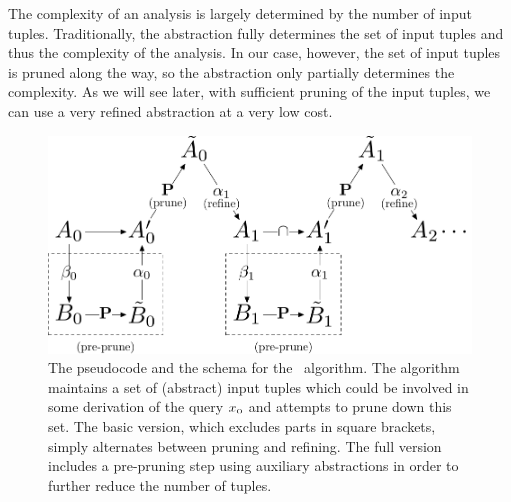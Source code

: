 The complexity of an analysis is largely determined by the number of input
tuples.  Traditionally, the abstraction fully determines the set of input
tuples and thus the complexity of the analysis.  In our case, however, the set
of input tuples is pruned along the way, so the abstraction only partially
determines the complexity.  As we will see later, with sufficient pruning of
the input tuples, we can use a very refined abstraction at a very low cost.


\begin{figure}[t]
\begin{center}  \end{center} %
\includegraphics[scale=0.5]{figures/algorithm}
\caption{\label{fig:pseudocode} The pseudocode and the schema for the \PR\ algorithm.
The algorithm maintains a set of (abstract) input tuples which could be
involved in some derivation of the query $x_\text{\sc o}$ and attempts to prune down this set.
The basic version, which excludes parts in square brackets,
simply alternates between pruning and refining.  The full version includes
a pre-pruning step using auxiliary abstractions in order to further reduce the
number of tuples.
}
\end{figure}

